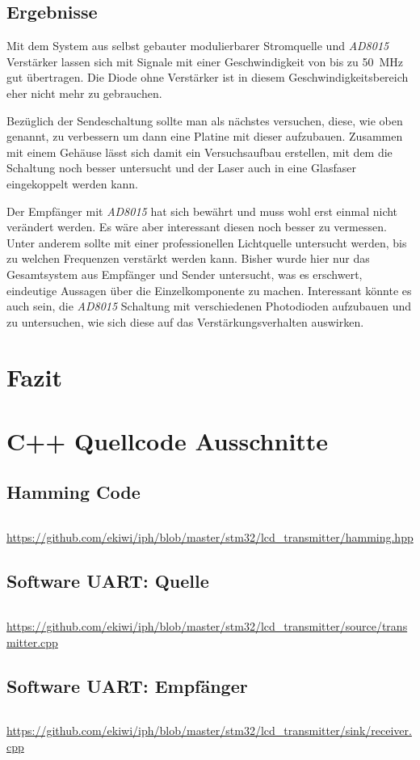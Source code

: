 \documentclass[12pt,a4paper]{article}
\begin{document}
\subsection{Ergebnisse}
Mit dem System aus selbst gebauter modulierbarer Stromquelle und \textit{AD8015} Verstärker lassen sich mit Signale mit einer Geschwindigkeit von bis zu \SI{50}{\mega\hertz} gut übertragen. Die Diode ohne Verstärker ist in diesem Geschwindigkeitsbereich eher nicht mehr zu gebrauchen.

Bezüglich der Sendeschaltung sollte man als nächstes versuchen, diese, wie oben genannt, zu verbessern um dann eine Platine mit dieser aufzubauen. Zusammen mit einem Gehäuse lässt sich damit ein Versuchsaufbau erstellen, mit dem die Schaltung noch besser untersucht und der Laser auch in eine Glasfaser eingekoppelt werden kann.

Der Empfänger mit \textit{AD8015} hat sich bewährt und muss wohl erst einmal nicht verändert werden. Es wäre aber interessant diesen noch besser zu vermessen. Unter anderem sollte mit einer professionellen Lichtquelle untersucht werden, bis zu welchen Frequenzen verstärkt werden kann. Bisher wurde hier nur das Gesamtsystem aus Empfänger und Sender untersucht, was es erschwert, eindeutige Aussagen über die Einzelkomponente zu machen. Interessant könnte es auch sein, die \textit{AD8015} Schaltung mit verschiedenen Photodioden aufzubauen und zu untersuchen, wie sich diese auf das Verstärkungsverhalten auswirken.

\section{Fazit}


\appendix
\section{C++ Quellcode Ausschnitte}

\subsection{Hamming Code}
\inputminted[label=hamming.hpp,linenos,tabsize=4,fontsize=\normalsize,frame=lines,rulecolor=\color{gray!70},framerule=1pt]{c++}{../stm32/lcd_transmitter/hamming.hpp}
\url{https://github.com/ekiwi/iph/blob/master/stm32/lcd\_transmitter/hamming.hpp}

\subsection{Software UART: Quelle}
\inputminted[label=transmitter.cpp,linenos,tabsize=4,fontsize=\normalsize,frame=lines,rulecolor=\color{gray!70},framerule=1pt]{c++}{../stm32/lcd_transmitter/source/transmitter.cpp}
\url{https://github.com/ekiwi/iph/blob/master/stm32/lcd\_transmitter/source/transmitter.cpp}

\subsection{Software UART: Empfänger}
\inputminted[label=receiver.cpp,linenos,tabsize=4,fontsize=\normalsize,frame=lines,rulecolor=\color{gray!70},framerule=1pt]{c++}{../stm32/lcd_transmitter/sink/receiver.cpp}
\url{https://github.com/ekiwi/iph/blob/master/stm32/lcd\_transmitter/sink/receiver.cpp}
\end{document}
